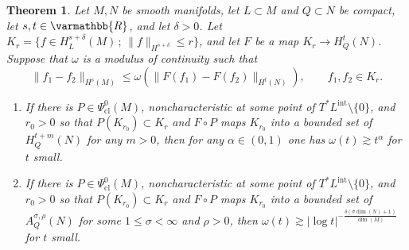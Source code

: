 \documentclass[12pt,twoside]{amsart}
\numberwithin{equation}{section}
\renewcommand{\leq}{\leqslant}
\renewcommand{\mathbb}{\varmathbb}
\newtheorem{theorem}{Theorem}[section]
\newcommand{\mR}{\mathbb{R}}                    %
\newcommand{\abs}[1]{\lvert #1 \rvert}          %
\newcommand{\norm}[1]{\lVert #1 \rVert}         %
\begin{document}
\begin{theorem} \label{thm_microlocal_smoothing}
Let $M, N$ be smooth manifolds, let $L \subset M$ and $Q \subset N$ be compact, let $s, t \in \mR$, and let $\delta > 0$. Let $K_r = \{ f \in H^{s+\delta}_L(M) \,;\, \norm{f}_{H^{s+\delta}} \leq r \}$, and let $F$ be a map $K_r \to H^t_Q(N)$. Suppose that $\omega$ is a modulus of continuity such that 
\[
\norm{f_1-f_2}_{H^s(M)} \leq \omega(\norm{F(f_1) - F(f_2)}_{H^t(N)}), \qquad f_1, f_2 \in K_r.
\]
\begin{enumerate}
\item[(a)] 
If there is $P \in \Psi^0_{\mathrm{cl}}(M)$, noncharacteristic at some point of $T^* L^{\mathrm{int}} \setminus \{0\}$, and $r_0 > 0$ so that $P(K_{r_0}) \subset K_r$ and $F \circ P$ maps $K_{r_0}$ into a bounded set of $H^{t+m}_Q(N)$ for any $m > 0$, then for any $\alpha \in (0,1)$ one has $\omega(t) \gtrsim t^{\alpha}$ for $t$ small.
\item[(b)] 
If there is $P \in \Psi^0_{\mathrm{cl}}(M)$, noncharacteristic at some point of $T^* L^{\mathrm{int}}  \setminus \{0\}$, and $r_0 > 0$ so that $P(K_{r_0}) \subset K_r$ and $F \circ P$ maps $K_{r_0}$ into a bounded set of $A^{\sigma,\rho}_Q(N)$ for some $1 \leq \sigma < \infty$ and $\rho > 0$, then $\omega(t) \gtrsim \abs{\log t}^{-\frac{\delta(\sigma \dim(N) +1)}{\dim(M)}}$ for $t$ small.
\end{enumerate}
\end{theorem}
\end{document}
